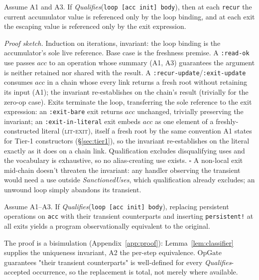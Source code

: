 \documentclass[sigplan,review,anonymous]{acmart}
\begin{document}
\begin{lemma}
\label{lem:classifier}
Assume A1 and A3. If \emph{Qualifies}(\texttt{loop [acc init] body}), then at each \texttt{recur} the current accumulator value is referenced only by the loop binding, and at each exit the escaping value is referenced only by the exit expression.
\end{lemma}
\emph{Proof sketch.} Induction on iterations, invariant: the loop binding is the accumulator's sole live reference. Base case is the freshness premise. A \texttt{:read-ok} use passes $acc$ to an operation whose summary (A1, A3) guarantees the argument is neither retained nor shared with the result. A \texttt{:recur-update}/\texttt{:exit-update} consumes $acc$ in a chain whose every link returns a fresh root without retaining its input (A1); the invariant re-establishes on the chain's result (trivially for the zero-op case). Exits terminate the loop, transferring the sole reference to the exit expression: an \texttt{:exit-bare} exit returns $acc$ unchanged, trivially preserving the invariant; an \texttt{:exit-in-literal} exit embeds $acc$ as one element of a freshly-constructed literal (\textsc{lit-exit}), itself a fresh root by the same convention A1 states for Tier-1 constructors (§\ref{sec:tier1}), so the invariant re-establishes on the literal exactly as it does on a chain link. Qualification excludes disqualifying uses and the vocabulary is exhaustive, so no alias-creating use exists. $\square$ A non-local exit mid-chain doesn't threaten the invariant: any handler observing the transient would need a use outside \emph{SanctionedUses}, which qualification already excludes; an unwound loop simply abandons its transient.

\begin{theorem}
\label{thm:sound}
Assume A1--A3. If \emph{Qualifies}(\texttt{loop [acc init] body}), replacing persistent operations on \texttt{acc} with their transient counterparts and inserting \texttt{persistent!} at all exits yields a program observationally equivalent to the original.
\end{theorem}

The proof is a bisimulation (Appendix~\ref{app:proof}): Lemma~\ref{lem:classifier} supplies the uniqueness invariant, A2 the per-step equivalence. $\mathrm{OpGate}$ guarantees "their transient counterparts" is well-defined for every \emph{Qualifies}-accepted occurrence, so the replacement is total, not merely where available.
\end{document}
